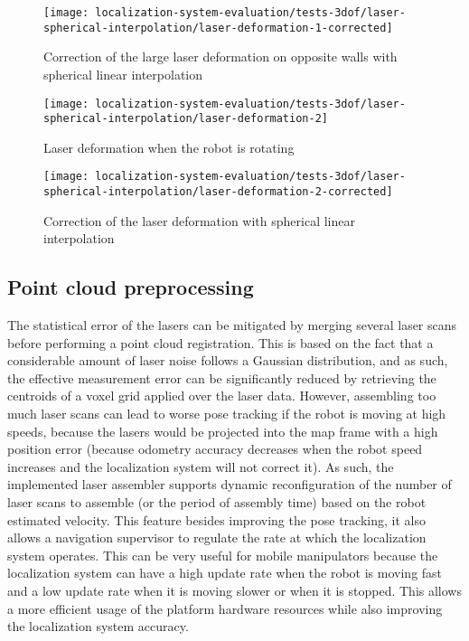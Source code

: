 \begin{figure}[ht]
	\centering
	\texttt{[image: localization-system-evaluation/tests-3dof/laser-spherical-interpolation/laser-deformation-1-corrected]}
	\caption{Correction of the large laser deformation on opposite walls with spherical linear interpolation}
	\label{fig:localization-system-evaluation_laser-deformation-1-corrected}
\end{figure}


\begin{figure}[ht]
	\centering
	\texttt{[image: localization-system-evaluation/tests-3dof/laser-spherical-interpolation/laser-deformation-2]}
	\caption{Laser deformation when the robot is rotating}
	\label{fig:localization-system-evaluation_laser-deformation-2}
\end{figure}

\begin{figure}[ht]
	\centering
	\texttt{[image: localization-system-evaluation/tests-3dof/laser-spherical-interpolation/laser-deformation-2-corrected]}
	\caption{Correction of the laser deformation with spherical linear interpolation}
	\label{fig:localization-system-evaluation_laser-deformation-2-corrected}
\end{figure}



\subsection{Point cloud preprocessing}

The statistical error of the lasers can be mitigated by merging several laser scans before performing a point cloud registration. This is based on the fact that a considerable amount of laser noise follows a Gaussian distribution, and as such, the effective measurement error can be significantly reduced by retrieving the centroids of a voxel grid applied over the laser data. However, assembling too much laser scans can lead to worse pose tracking if the robot is moving at high speeds, because the lasers would be projected into the map frame with a high position error (because odometry accuracy decreases when the robot speed increases and the localization system will not correct it). As such, the implemented laser assembler supports dynamic reconfiguration of the number of laser scans to assemble (or the period of assembly time) based on the robot estimated velocity. This feature besides improving the pose tracking, it also allows a navigation supervisor to regulate the rate at which the localization system operates. This can be very useful for mobile manipulators because the localization system can have a high update rate when the robot is moving fast and a low update rate when it is moving slower or when it is stopped. This allows a more efficient usage of the platform hardware resources while also improving the localization system accuracy.

